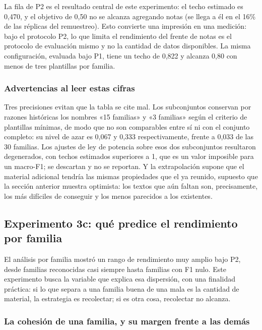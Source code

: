 La fila de P2 es el resultado central de este experimento: el techo estimado es 0,470, y el objetivo de 0,50 no se alcanza agregando notas (se llega a él en el 16\% de las réplicas del remuestreo). Esto convierte una impresión en una medición: bajo el protocolo P2, lo que limita el rendimiento del frente de notas es el protocolo de evaluación mismo y no la cantidad de datos disponibles. La misma configuración, evaluada bajo P1, tiene un techo de 0,822 y alcanza 0,80 con menos de tres plantillas por familia.

\subsubsection*{Advertencias al leer estas cifras}

Tres precisiones evitan que la tabla se cite mal. Los subconjuntos conservan por razones históricas los nombres «15 familias» y «3 familias» según el criterio de plantillas mínimas, de modo que no son comparables entre sí ni con el conjunto completo: su nivel de azar es 0,067 y 0,333 respectivamente, frente a 0,033 de las 30 familias. Los ajustes de ley de potencia sobre esos dos subconjuntos resultaron degenerados, con techos estimados superiores a 1, que es un valor imposible para un macro-F1; se descartan y no se reportan. Y la extrapolación supone que el material adicional tendría las mismas propiedades que el ya reunido, supuesto que la sección anterior muestra optimista: los textos que aún faltan son, precisamente, los más difíciles de conseguir y los menos parecidos a los existentes.

\subsection{Experimento 3c: qué predice el rendimiento por familia}
\label{subsec:res_cohesion}

El análisis por familia mostró un rango de rendimiento muy amplio bajo P2, desde familias reconocidas casi siempre hasta familias con F1 nulo. Este experimento busca la variable que explica esa dispersión, con una finalidad práctica: si lo que separa a una familia buena de una mala es la cantidad de material, la estrategia es recolectar; si es otra cosa, recolectar no alcanza.

\subsubsection*{La cohesión de una familia, y su margen frente a las demás}

